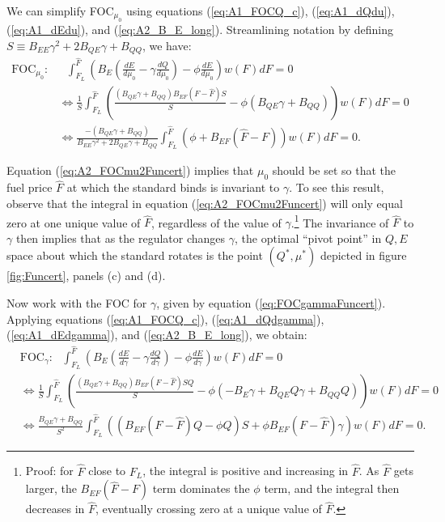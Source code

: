 \documentclass[12pt]{article}
\begin{document}
We can simplify FOC$_{\mu_0}$ using equations (\ref{eq:A1_FOCQ_c}), (\ref{eq:A1_dQdu}), (\ref{eq:A1_dEdu}), and (\ref{eq:A2_B_E_long}). Streamlining notation by defining $S\equiv B_{EE}\gamma^2+2B_{QE}\gamma+B_{QQ}$, we have:
\begin{align}
\text{FOC}_{\mu_0}:& \text{ } \int_{F_L}^{\hat{F}}\left(B_E(\frac{dE}{d\mu_0}-\gamma\frac{dQ}{d\mu_0}) -\phi\frac{dE}{d\mu_0}\right)w(F)dF = 0 \\
&\Leftrightarrow \frac{1}{S}\int_{F_L}^{\hat{F}}\left(\frac{(B_{QE}\gamma+B_{QQ})B_{EF}(F-\hat{F})S}{S}-\phi(B_{QE}\gamma+B_{QQ})\right)w(F)dF = 0 \\
&\Leftrightarrow \frac{-(B_{QE}\gamma+B_{QQ})}{B_{EE}\gamma^2+2B_{QE}\gamma+B_{QQ}} \int_{F_L}^{\hat{F}}\left(\phi+B_{EF}(\hat{F}-F)\right)w(F)dF=0. \label{eq:A2_FOCmu2Funcert}
\end{align}

Equation (\ref{eq:A2_FOCmu2Funcert}) implies that $\mu_0$ should be set so that the fuel price $\hat{F}$ at which the standard binds is invariant to $\gamma$. To see this result, observe that the integral in equation (\ref{eq:A2_FOCmu2Funcert}) will only equal zero at one unique value of $\hat{F}$, regardless of the value of $\gamma$.\footnote{Proof: for $\hat{F}$ close to $F_L$, the integral is positive and increasing in $\hat{F}$. As $\hat{F}$ gets larger, the $B_{EF}(\hat{F}-F)$ term dominates the $\phi$ term, and the integral then decreases in $\hat{F}$, eventually crossing zero at a unique value of $\hat{F}$.} The invariance of $\hat{F}$ to $\gamma$ then implies that as the regulator changes $\gamma$, the optimal ``pivot point'' in $Q,E$ space about which the standard rotates is the point $(Q^*,\mu^*)$ depicted in figure \ref{fig:Funcert}, panels (c) and (d).

Now work with the FOC for $\gamma$, given by equation (\ref{eq:FOCgammaFuncert}). Applying equations (\ref{eq:A1_FOCQ_c}), (\ref{eq:A1_dQdgamma}), (\ref{eq:A1_dEdgamma}), and (\ref{eq:A2_B_E_long}), we obtain:
\begin{align}
&\text{FOC}_{\gamma}: \text{ } \int_{F_L}^{\hat{F}}\left(B_E(\frac{dE}{d\gamma}-\gamma\frac{dQ}{d\gamma}) -\phi\frac{dE}{d\gamma}\right)w(F)dF = 0 \\
&\Leftrightarrow \frac{1}{S}\int_{F_L}^{\hat{F}}\left(\frac{(B_{QE}\gamma+B_{QQ})B_{EF}(F-\hat{F})SQ}{S} -\phi(-B_E\gamma+B_{QE}Q\gamma+B_{QQ}Q)\right)w(F)dF = 0 \nonumber \\
&\Leftrightarrow \frac{B_{QE}\gamma+B_{QQ}}{S^2} \int_{F_L}^{\hat{F}}\left((B_{EF}(F-\hat{F})Q-\phi Q)S + \phi B_{EF}(F-\hat{F})\gamma\right)w(F)dF=0. \label{eq:A2_FOCgamma2}
\end{align}
\end{document}
